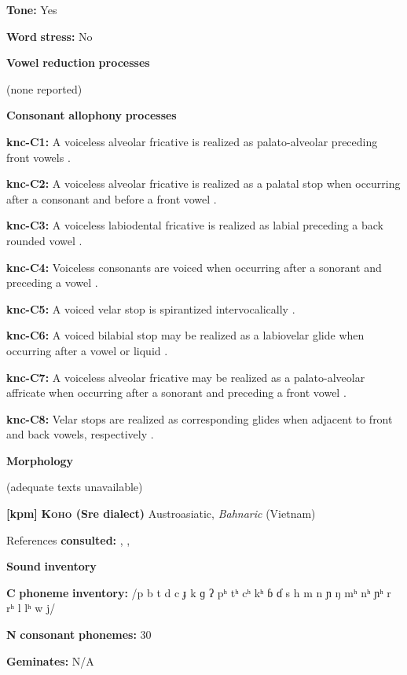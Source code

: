 \textbf{Tone:} Yes

\textbf{Word} \textbf{stress:} No

\textbf{Vowel} \textbf{reduction} \textbf{processes}

(none reported)

\textbf{Consonant} \textbf{allophony} \textbf{processes}

\textbf{knc-C1:} A voiceless alveolar fricative is realized as palato-alveolar preceding front vowels \citep[20]{Cyffer1998}.

\textbf{knc-C2:} A voiceless alveolar fricative is realized as a palatal stop when occurring after a consonant and before a front vowel \citep[21]{Cyffer1998}.

\textbf{knc-C3:} A voiceless labiodental fricative is realized as labial preceding a back rounded vowel \citep[23]{Cyffer1998}.

\textbf{knc-C4:} Voiceless consonants are voiced when occurring after a sonorant and preceding a vowel \citep[22]{Cyffer1998}.

\textbf{knc-C5:} A voiced velar stop is spirantized intervocalically \citep[22]{Cyffer1998}.

\textbf{knc-C6:} A voiced bilabial stop may be realized as a labiovelar glide when occurring after a vowel or liquid \citep[22]{Cyffer1998}.

\textbf{knc-C7:} A voiceless alveolar fricative may be realized as a palato-alveolar affricate when occurring after a sonorant and preceding a front vowel \citep[21]{Cyffer1998}.

\textbf{knc-C8:} Velar stops are realized as corresponding glides when adjacent to front and back vowels, respectively \citep[22]{Cyffer1998}.

\textbf{Morphology}

(adequate texts unavailable)

\textbf{[kpm]}   \textbf{\textsc{Koho} \textbf{(Sre} \textbf{dialect)}}  Austroasiatic, \textit{Bahnaric} (Vietnam)

References \textbf{consulted:} \citet{LadefogedMaddieson1996}, \citet{Manley1972}, \citet{Olsen2014}

\textbf{Sound} \textbf{inventory}

\textbf{C} \textbf{phoneme} \textbf{inventory:} /p b t d c ɟ k ɡ ʔ pʰ tʰ cʰ kʰ ɓ ɗ s h m n ɲ ŋ mʰ nʰ ɲʰ r rʰ l lʰ w j/

\textbf{N} \textbf{consonant} \textbf{phonemes:} 30

\textbf{Geminates:} N/A

